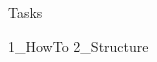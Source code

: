 \documentclass[12pt]{article}
\begin{document}



\frontmatter
\mainmatter %


{Tasks}




\addappendix
{1_HowTo} 
{2_Structure} 
\end{document}
